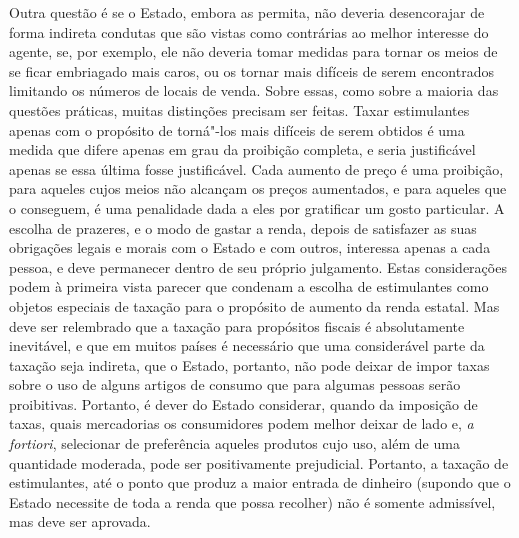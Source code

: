 Outra questão é se o Estado, embora as permita, não deveria
desencorajar de forma indireta condutas que são vistas como
contrárias ao melhor interesse do agente, se, por exemplo, ele não
deveria tomar medidas para tornar os meios de se ficar
embriagado mais caros, ou os tornar mais difíceis de serem encontrados
limitando os números de locais de venda. Sobre essas, como sobre a
maioria das questões práticas, muitas distinções precisam ser feitas.
Taxar estimulantes apenas com o propósito de torná"-los mais difíceis
de serem obtidos é uma medida que difere apenas em grau da proibição
completa, e seria justificável apenas se essa última fosse
justificável. Cada aumento de preço é uma proibição, para aqueles cujos
meios não alcançam os preços aumentados, e para aqueles que o
conseguem, é uma penalidade dada a eles por gratificar um gosto
particular. A escolha de prazeres, e o modo de gastar a renda, depois
de satisfazer as suas obrigações legais e morais com o Estado e com
outros, interessa apenas a cada pessoa, e deve permanecer dentro de seu
próprio julgamento. Estas considerações podem à primeira vista parecer
que condenam a escolha de estimulantes como objetos especiais de
taxação para o propósito de aumento da renda estatal. Mas deve ser
relembrado que a taxação para propósitos fiscais é absolutamente
inevitável, e que em muitos países é necessário que uma considerável
parte da taxação seja indireta, que o Estado, portanto, não pode deixar
de impor taxas sobre o uso de alguns artigos de consumo que para
algumas pessoas serão proibitivas. Portanto, é dever do Estado
considerar, quando da imposição de taxas, quais mercadorias os
consumidores podem melhor deixar de lado e, \textit{a fortiori}, selecionar de
preferência aqueles produtos cujo uso, além de uma quantidade
moderada, pode ser positivamente prejudicial. Portanto, a taxação de
estimulantes, até o ponto que produz a maior entrada de dinheiro
(supondo que o Estado necessite de toda a renda que possa recolher) não
é somente admissível, mas deve ser aprovada.

